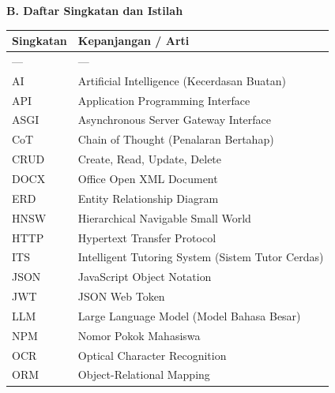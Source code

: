 \documentclass[12pt,a4paper]{article}
\begin{document}
\textbf{B. Daftar Singkatan dan Istilah}



\begin{table}[h]

\centering

\begin{tabular}{ll}

\toprule

Singkatan & Kepanjangan / Arti \\

\midrule

--- & --- \\

AI & Artificial Intelligence (Kecerdasan Buatan) \\

API & Application Programming Interface \\

ASGI & Asynchronous Server Gateway Interface \\

CoT & Chain of Thought (Penalaran Bertahap) \\

CRUD & Create, Read, Update, Delete \\

DOCX & Office Open XML Document \\

ERD & Entity Relationship Diagram \\

HNSW & Hierarchical Navigable Small World \\

HTTP & Hypertext Transfer Protocol \\

ITS & Intelligent Tutoring System (Sistem Tutor Cerdas) \\

JSON & JavaScript Object Notation \\

JWT & JSON Web Token \\

LLM & Large Language Model (Model Bahasa Besar) \\

NPM & Nomor Pokok Mahasiswa \\

OCR & Optical Character Recognition \\

ORM & Object-Relational Mapping \\


\end{tabular}
\end{table}
\end{document}
